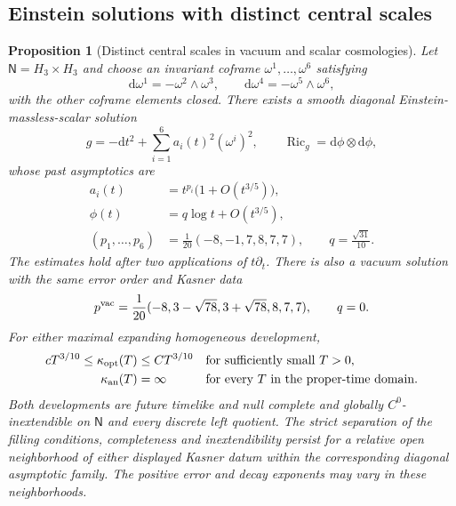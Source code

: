 \documentclass[10pt,a4paper]{article}
\numberwithin{equation}{section}
\newtheorem{proposition}[theorem]{Proposition}
\theoremstyle{definition}
\theoremstyle{remark}
\newcommand{\dd}{\mathrm d}
\begin{document}
\subsection{Einstein solutions with distinct central scales}

\begin{proposition}[Distinct central scales in vacuum and scalar cosmologies]
\label{prop:einstein-optimal-separation}
Let $\mathsf N=H_3\times H_3$ and choose an invariant coframe
$\omega^1,\ldots,\omega^6$ satisfying
\[
 \dd\omega^1=-\omega^2\wedge\omega^3,\qquad
 \dd\omega^4=-\omega^5\wedge\omega^6,
\]
with the other coframe elements closed.  There exists a smooth
diagonal Einstein-massless-scalar solution
\[
 g=-\dd t^2+\sum_{i=1}^6 a_i(t)^2(\omega^i)^2,
 \qquad \operatorname{Ric}_g=\dd\phi\otimes\dd\phi,
\]
whose past asymptotics are
\begin{equation}
 \begin{split}
 a_i(t)&=t^{p_i}\bigl(1+O(t^{3/5})\bigr),\\
 \phi(t)&=q\log t+O(t^{3/5}),\\
 (p_1,\ldots,p_6)&=\frac1{20}(-8,-1,7,8,7,7),
 \qquad q=\frac{\sqrt{31}}{10}.
 \end{split}
 \label{eq:einstein-optimal-separation-data}
\end{equation}
The estimates hold after two applications of $t\partial_t$.
There is also a vacuum solution with the same error order and
Kasner data
\begin{equation}
 p^{\rm vac}=\frac1{20}
       (-8,3-\sqrt{78},3+\sqrt{78},8,7,7),\qquad q=0.
 \label{eq:vacuum-optimal-separation-data}
\end{equation}
For either maximal expanding homogeneous development,
\begin{align}
 cT^{3/10}\le\kappa_{\rm opt}(T)&\le C T^{3/10}
       &&\text{for sufficiently small }T>0,\notag\\
 \kappa_{\rm an}(T)&=\infty
       &&\text{for every }T\text{ in the proper-time domain}.
 \label{eq:einstein-optimal-separation}
\end{align}
Both developments are future timelike and null complete and globally
$C^0$-inextendible on $\mathsf N$ and every discrete left quotient.
The strict separation of the filling conditions, completeness and
inextendibility persist for a relative open neighborhood of either
displayed Kasner datum within the corresponding diagonal asymptotic
family.  The positive error and decay exponents may vary in these
neighborhoods.
\end{proposition}
\end{document}

